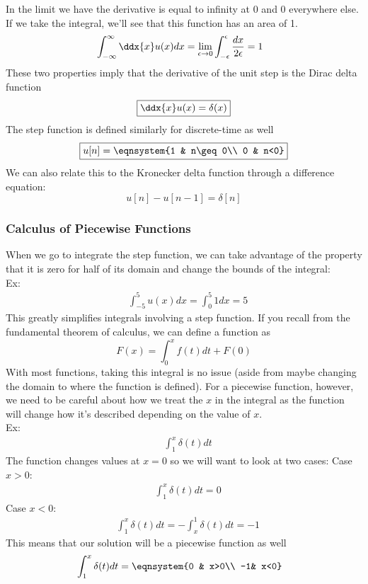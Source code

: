 In the limit we have the derivative is equal to infinity at 0 and 0 everywhere else. If we take the integral, we'll see that this function has an area of 1.
\begin{align*}
    &\int_{-\infty}^\infty\ddx{x}u(x)dx=\lim_{\epsilon\to0}\int_{-\epsilon}^\epsilon\frac{dx}{2\epsilon}=1
\end{align*}
These two properties imply that the derivative of the unit step is the Dirac delta function
$$\boxed{\ddx{x}u(x)=\delta(x)}$$
The step function is defined similarly for discrete-time as well
$$\boxed{u[n]=\eqnsystem{1 & n\geq 0\\ 0 & n<0}}$$
We can also relate this to the Kronecker delta function through a difference equation:
$$\boxed{u[n]-u[n-1]=\delta[n]}$$

\subsubsection{Calculus of Piecewise Functions}
When we go to integrate the step function, we can take advantage of the property that it is zero for half of its domain and change the bounds of the integral:\\
Ex:
\begin{align*}
    &\int_{-5}^5 u(x)dx=\int_0^5 1dx=5
\end{align*}
This greatly simplifies integrals involving a step function. If you recall from the fundamental theorem of calculus, we can define a function as
$$F(x)=\int_0^x f(t)dt+F(0)$$
With most functions, taking this integral is no issue (aside from maybe changing the domain to where the function is defined). For a piecewise function, however, we need to be careful about how we treat the $x$ in the integral as the function will change how it's described depending on the value of $x$.\\
Ex:
\begin{align*}
    &\int_1^x\delta(t)dt
\end{align*}
The function changes values at $x=0$ so we will want to look at two cases:
Case $x>0$:
\begin{align*}
    &\int_1^x\delta(t)dt=0
\end{align*}
Case $x<0$:
\begin{align*}
    &\int_1^x\delta(t)dt=-\int_x^1\delta(t)dt=-1
\end{align*}
This means that our solution will be a piecewise function as well
\begin{align*}
    &\int_1^x\delta(t)dt=\eqnsystem{0 & x>0\\ -1& x<0}
\end{align*}
